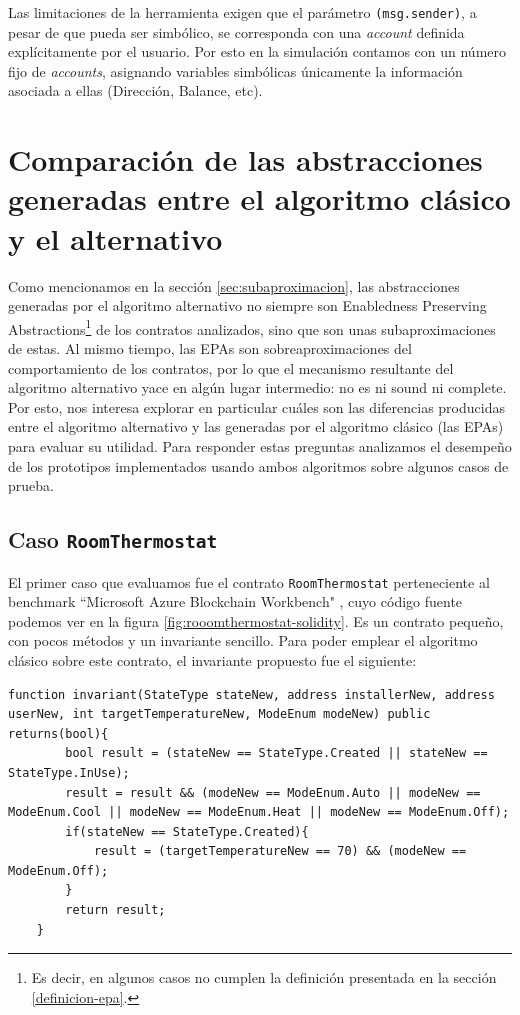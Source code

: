 Las limitaciones de la herramienta exigen que el parámetro \texttt{(msg.sender)}, a pesar de que pueda ser simbólico, se corresponda con una \textit{account} definida explícitamente por el usuario.
Por esto en la simulación contamos con un número fijo de \textit{accounts}, asignando variables simbólicas únicamente la información asociada a ellas (Dirección, Balance, etc).

\section{Comparación de las abstracciones generadas entre el algoritmo clásico y el alternativo}
Como mencionamos en la sección \ref{sec:subaproximacion}, las abstracciones generadas por el algoritmo alternativo no siempre son Enabledness Preserving Abstractions\footnote{Es decir, en algunos casos no cumplen la definición presentada en la sección \ref{definicion-epa}.} de los contratos analizados, sino que son unas subaproximaciones de estas.
Al mismo tiempo, las EPAs son sobreaproximaciones del comportamiento de los contratos, por lo que el mecanismo resultante del algoritmo alternativo yace en algún lugar intermedio: no es ni sound ni complete.
Por esto, nos interesa explorar en particular cuáles son las diferencias producidas entre el algoritmo alternativo y las generadas por el algoritmo clásico (las EPAs) para evaluar su utilidad.
Para responder estas preguntas analizamos el desempeño de los prototipos implementados usando ambos algoritmos sobre algunos casos de prueba.

\subsection{Caso \texttt{RoomThermostat}}
El primer caso que evaluamos fue el contrato \texttt{RoomThermostat} perteneciente al benchmark ``Microsoft Azure Blockchain Workbench" \cite{azure-benchmark}, cuyo código fuente podemos ver en la figura \ref{fig:rooomthermostat-solidity}.
Es un contrato pequeño, con pocos métodos y un invariante sencillo.
Para poder emplear el algoritmo clásico sobre este contrato, el invariante propuesto fue el siguiente:
\begin{lstlisting}[language=Solidity]
    function invariant(StateType stateNew, address installerNew, address userNew, int targetTemperatureNew, ModeEnum modeNew) public returns(bool){
        bool result = (stateNew == StateType.Created || stateNew == StateType.InUse);
        result = result && (modeNew == ModeEnum.Auto || modeNew == ModeEnum.Cool || modeNew == ModeEnum.Heat || modeNew == ModeEnum.Off);
        if(stateNew == StateType.Created){
            result = (targetTemperatureNew == 70) && (modeNew == ModeEnum.Off);
        }
        return result;
    }
\end{lstlisting}

